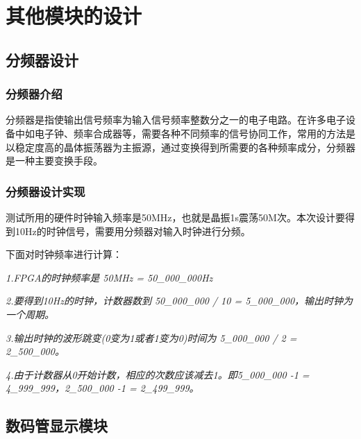 \documentclass[12pt,a4paper]{article}
\begin{document}
	\section{其他模块的设计}
	\subsection{分频器设计}
	\subsubsection{分频器介绍}
	分频器是指使输出信号频率为输入信号频率整数分之一的电子电路。在许多电子设备中如电子钟、频率合成器等，需要各种不同频率的信号协同工作，常用的方法是以稳定度高的晶体振荡器为主振源，通过变换得到所需要的各种频率成分，分频器是一种主要变换手段。
	\subsubsection{分频器设计实现}
	测试所用的硬件时钟输入频率是50MHz，也就是晶振1s震荡50M次。本次设计要得到10Hz的时钟信号，需要用分频器对输入时钟进行分频。
	
	下面对时钟频率进行计算：
	
{\small 	
	\textit{1.FPGA的时钟频率是 50MHz = 50\_000\_000Hz}
	
	\textit{2.要得到10Hz的时钟，计数器数到 50\_000\_000 / 10 = 5\_000\_000，输出时钟为一个周期。}
	
	\textit{3.输出时钟的波形跳变(0变为1或者1变为0)时间为 5\_000\_000 / 2 = 2\_500\_000。}
	
	\textit{4.由于计数器从0开始计数，相应的次数应该减去1。即5\_000\_000 -1 = 4\_999\_999，2\_500\_000 -1 = 2\_499\_999。}}
	\subsection{数码管显示模块}
\end{document}
